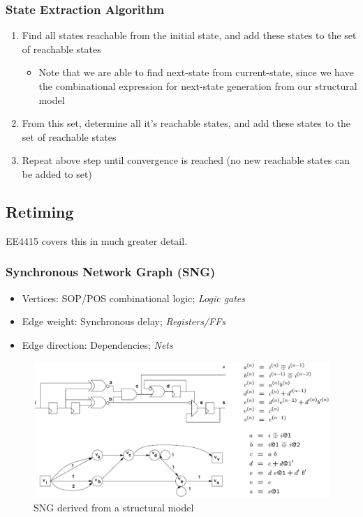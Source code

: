 \documentclass{article}
\begin{document}
\subsubsection{State Extraction Algorithm}
\begin{enumerate}
    \item Find all states reachable from the initial state, and add these states to the set of reachable states
        \begin{itemize}
            \item Note that we are able to find next-state from current-state, since we have the combinational expression for next-state generation from our structural model
        \end{itemize}
    \item From this set, determine all it's reachable states, and add these states to the set of reachable states
    \item Repeat above step until convergence is reached (no new reachable states can be added to set)
\end{enumerate}

\newpage
\subsection{Retiming}
EE4415 covers this in much greater detail.

\subsubsection{Synchronous Network Graph (SNG)}
\begin{itemize}
    \item Vertices: SOP/POS combinational logic; \textit{Logic gates}
    \item Edge weight: Synchronous delay; \textit{Registers/FFs}
    \item Edge direction: Dependencies; \textit{Nets}
\end{itemize}

\begin{figure}[htp]
    \centering
    \includegraphics[width=19cm, scale=1]{S2/syncNetworkGraph.PNG}
    \caption{SNG derived from a structural model}
\end{figure}
\end{document}
